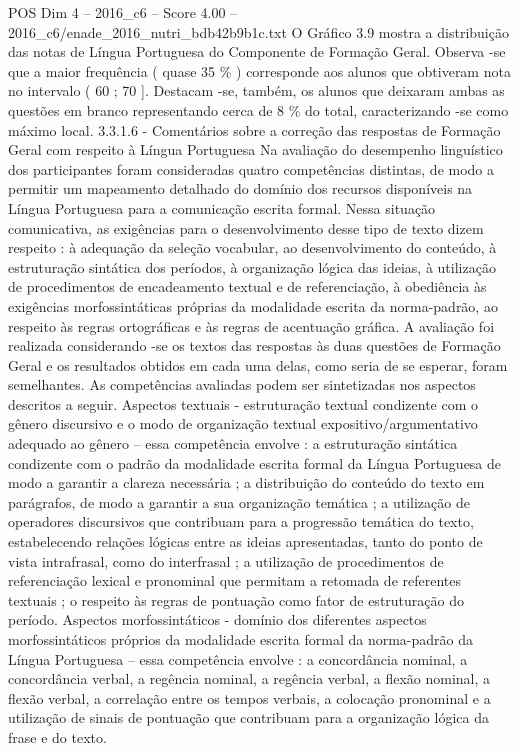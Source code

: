 \begin{textsample}{POS Dim 4 – 2016\_c6 – Score 4.00 – 2016\_c6/enade\_2016\_nutri\_bdb42b9b1c.txt}
O Gráfico 3.9 mostra a distribuição das notas de Língua Portuguesa do Componente de Formação Geral.
Observa -se que a maior frequência ( quase 35 \% ) corresponde aos alunos que obtiveram nota no intervalo ( 60 ; 70 ].
Destacam -se, também, os alunos que deixaram ambas as questões em branco representando cerca de 8 \% do total, caracterizando -se como máximo local. 3.3.1.6 - Comentários sobre a correção das respostas de Formação Geral com respeito à Língua Portuguesa Na avaliação do desempenho linguístico dos participantes foram consideradas quatro competências distintas, de modo a permitir um mapeamento detalhado do domínio dos recursos disponíveis na Língua Portuguesa para a comunicação escrita formal.
Nessa situação comunicativa, as exigências para o desenvolvimento desse tipo de texto dizem respeito : à adequação da seleção vocabular, ao desenvolvimento do conteúdo, à estruturação sintática dos períodos, à organização lógica das ideias, à utilização de procedimentos de encadeamento textual e de referenciação, à obediência às exigências morfossintáticas próprias da modalidade escrita da norma-padrão, ao respeito às regras ortográficas e às regras de acentuação gráfica.
A avaliação foi realizada considerando -se os textos das respostas às duas questões de Formação Geral e os resultados obtidos em cada uma delas, como seria de se esperar, foram semelhantes.
As competências avaliadas podem ser sintetizadas nos aspectos descritos a seguir.
Aspectos textuais - estruturação textual condizente com o gênero discursivo e o modo de organização textual expositivo/argumentativo adequado ao gênero – essa competência envolve : a estruturação sintática condizente com o padrão da modalidade escrita formal da Língua Portuguesa de modo a garantir a clareza necessária ; a distribuição do conteúdo do texto em parágrafos, de modo a garantir a sua organização temática ; a utilização de operadores discursivos que contribuam para a progressão temática do texto, estabelecendo relações lógicas entre as ideias apresentadas, tanto do ponto de vista intrafrasal, como do interfrasal ; a utilização de procedimentos de referenciação lexical e pronominal que permitam a retomada de referentes textuais ; o respeito às regras de pontuação como fator de estruturação do período.
Aspectos morfossintáticos - domínio dos diferentes aspectos morfossintáticos próprios da modalidade escrita formal da norma-padrão da Língua Portuguesa – essa competência envolve : a concordância nominal, a concordância verbal, a regência nominal, a regência verbal, a flexão nominal, a flexão verbal, a correlação entre os tempos verbais, a colocação pronominal e a utilização de sinais de pontuação que contribuam para a organização lógica da frase e do texto.

\end{textsample}
